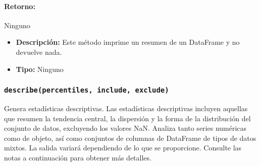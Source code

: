         \paragraph{Retorno:} Ninguno
        \begin{itemize}
            \item \textbf{Descripción:} Este método imprime un resumen de un DataFrame y no devuelve nada.
            \item \textbf{Tipo:} Ninguno
        \end{itemize}


        \subsubsection{\texttt{describe(percentiles, include, exclude)}}Genera estadísticas descriptivas. Las estadísticas descriptivas incluyen aquellas que resumen la tendencia central, la dispersión y la forma de la distribución del conjunto de datos, excluyendo los valores NaN. Analiza tanto series numéricas como de objeto, así como conjuntos de columnas de DataFrame de tipos de datos mixtos. La salida variará dependiendo de lo que se proporcione. Consulte las notas a continuación para obtener más detalles.


